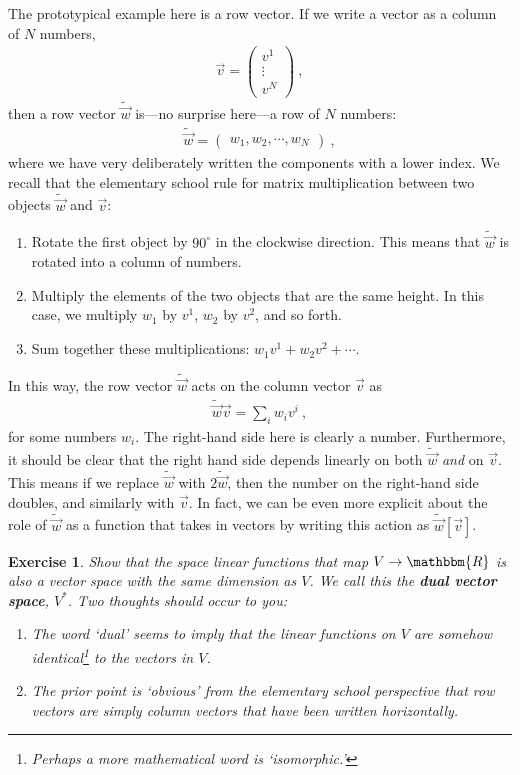 \documentclass[
  11pt,
	colorful,
	raggedright,
]{tufte-style-thesis-flip}
\newtheorem{exercise}{Exercise}[section]
\begin{document}
The prototypical example here is a row vector. If we write a vector as a column of $N$ numbers,
\begin{align}
   \vec v = 
   \begin{pmatrix}
     v^1 \\
     \vdots \\
     v^N
   \end{pmatrix} \ ,
 \end{align}
 then a row vector $\tilde{\vec w}$ is---no surprise here---a row of $N$ numbers:
\begin{align}
  \tilde{\vec w} = 
  \begin{pmatrix}
    w_1, w_2, \cdots, w_N
  \end{pmatrix}\ ,
\end{align}
where we have very deliberately written the components with a lower index. We recall that the elementary school rule for matrix multiplication between two objects $\tilde{\vec w}$ and $\vec v$:
\begin{enumerate}
  \item Rotate the first object by $90^\circ$ in the clockwise direction. This means that $\tilde{\vec w}$ is rotated into a column of numbers.
  \item Multiply the elements of the two objects that are the same height. In this case, we multiply $w_1$ by $v^1$, $w_2$ by $v^2$, and so forth. 
  \item Sum together these multiplications: $w_1v^1 + w_2v^2 + \cdots$.
\end{enumerate}
In this way, the row vector $\tilde{\vec w}$ acts on the column vector $\vec v$ as
\begin{align}
  \tilde{\vec w} \vec v = \sum_i w_iv^i \ ,
  \label{eq:dual:vec:act:on:vec}
\end{align}
for some numbers $w_i$. The right-hand side here is clearly a number. Furthermore, it should be clear that the right hand side depends linearly on both $\tilde{\vec w}$ \emph{and} on $\vec v$. This means if we replace $\tilde{\vec w}$ with $2 \tilde{\vec w}$, then the number on the right-hand side doubles, and similarly with $\vec v$. In fact, we can be even more explicit about the role of $\tilde{\vec w}$ as a function that takes in vectors by writing this action as $\tilde{\vec w}[\vec v]$.

\begin{exercise}
Show that the space linear functions that map $V\to \mathbbm{R}$ is also a vector space with the same dimension as $V$. We call this the \textbf{dual vector space}, $V^*$. Two thoughts should occur to you:
\begin{enumerate}
  \item The word `dual' seems to imply that the linear functions on $V$  are somehow identical\footnote{Perhaps a more mathematical word is `isomorphic.'} to the vectors in $V$.
  \item The prior point is `obvious' from the elementary school perspective that row vectors are simply column vectors that have been written horizontally.
\end{enumerate}
\end{exercise}
\end{document}
